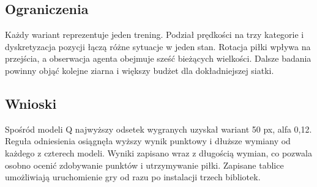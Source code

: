 \documentclass[10pt,a4paper]{article}
\begin{document}
\subsection*{Ograniczenia}
Każdy wariant reprezentuje jeden trening. Podział prędkości na trzy
kategorie i dyskretyzacja pozycji łączą różne sytuacje w jeden stan.
Rotacja piłki wpływa na przejścia, a obserwacja agenta obejmuje sześć
bieżących wielkości. Dalsze badania powinny objąć kolejne ziarna i
większy budżet dla dokładniejszej siatki.

\subsection*{Wnioski}
Spośród modeli Q najwyższy odsetek wygranych uzyskał wariant 50 px, alfa 0,12. Reguła odniesienia osiągnęła wyższy wynik punktowy i dłuższe wymiany od każdego z czterech modeli. Wyniki zapisano wraz z długością wymian, co pozwala osobno ocenić
zdobywanie punktów i utrzymywanie piłki. Zapisane tablice umożliwiają
uruchomienie gry od razu po instalacji trzech bibliotek.
\end{document}
